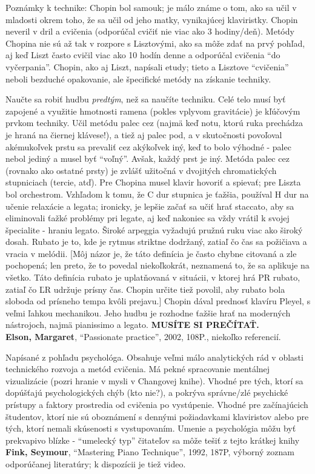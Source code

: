 Poznámky k technike: Chopin bol samouk; je málo známe o tom, ako sa učil v mladosti okrem toho, že sa učil od jeho matky, vynikajúcej klaviristky. Chopin neveril v dril a cvičenia (odporúčal cvičiť nie viac ako 3 hodiny/deň). Metódy Chopina nie sú až tak v rozpore s Lisztovými, ako sa môže zdať na prvý pohľad, aj keď Liszt často cvičil viac ako 10 hodín denne a odporúčal cvičenia “do vyčerpania”. Chopin, ako aj Liszt, napísali etudy; tieto a Lisztove “cvičenia” neboli bezduché opakovanie, ale špecifické metódy na získanie techniky. 

Naučte sa robiť hudbu \textit{predtým}, než sa naučíte techniku. Celé telo musí byť zapojené a využitie hmotnosti ramena (pokles vplyvom gravitácie) je kľúčovým prvkom techniky. Učil metódu palec cez (najmä keď notu, ktorú ruka prechádza je hraná na čiernej klávese!), a tiež aj palec pod, a v skutočnosti povoľoval akémukoľvek prstu sa prevaliť cez akýkoľvek iný, keď to bolo výhodné - palec nebol jediný a musel byť “voľný”. Avšak, každý prst je iný. Metóda palec cez (rovnako ako ostatné prsty) je zvlášť užitočná v dvojitých chromatických stupniciach (tercie, atď). Pre Chopina musel klavir hovoriť a spievať; pre Liszta bol orchestrom. Vzhľadom k tomu, že C dur stupnica je ťažšia, používal H dur na učenie relaxácie a legata; ironicky, je lepšie začať sa učiť hrať staccato, aby sa eliminovali ťažké problémy pri legate, aj keď nakoniec sa vždy vrátil k svojej špecialite - hraniu legato. Široké arpeggia vyžadujú pružnú ruku viac ako široký dosah. Rubato je to, kde je rytmus striktne dodržaný, zatiaľ čo čas sa požičiava a vracia v melódii. [Môj názor je, že táto definícia je často chybne citovaná a zle pochopená; len preto, že to povedal niekoľkokrát, neznamená to, že sa aplikuje na všetko. Táto definícia rubato je uplatňovaná v situácii, v ktorej hrá PR rubato, zatiaľ čo ĽR udržuje prísny čas. Chopin určite tiež povolil, aby rubato bola sloboda od prísneho tempa kvôli prejavu.] Chopin dával prednosť klavíru Pleyel, s veľmi ľahkou mechanikou. Jeho hudbu je rozhodne ťažšie hrať na moderných nástrojoch, najmä pianissimo a legato. \textbf{MUSÍTE SI PREČÍTAŤ.}
\medskip\\
\textbf{Elson, Margaret}, “Passionate practice”, 2002, 108P., niekoľko referencií. 

Napísané z pohľadu psychológa. Obsahuje veľmi málo analytických rád v oblasti technického rozvoja a metód cvičenia. Má pekné spracovanie mentálnej vizualizácie (pozri hranie v mysli v Changovej knihe). Vhodné pre tých, ktorí sa dopúšťajú psychologických chýb (kto nie?), a pokrýva správne/zlé psychické prístupy a faktory prostredia od cvičenia po vystúpenie. Vhodné pre začínajúcich študentov, ktorí nie sú oboznámení s dennými požiadavkami klaviristov alebo pre tých, ktorí nemali skúsenosti s vystupovaním. Umenie a psychológia môžu byť prekvapivo blízke - “umelecký typ” čitateľov sa môže tešiť z tejto krátkej knihy 
\medskip\\
\textbf{Fink, Seymour}, “Mastering Piano Technique”, 1992, 187P, výborný zoznam odporúčanej literatúry; k dispozícii je tiež video. 

